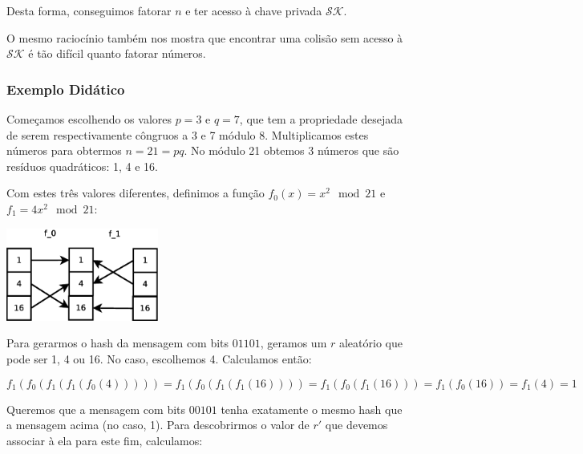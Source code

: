 \documentclass[a4paper]{article}
\begin{document}
Desta forma, conseguimos fatorar $n$ e ter acesso à chave privada
$\mathcal{SK}$.

O mesmo raciocínio também nos mostra que encontrar uma colisão sem
acesso à $\mathcal{SK}$ é tão difícil quanto fatorar números.





  

\subsubsection{Exemplo Didático}

Começamos escolhendo os valores $p=3$ e $q=7$, que tem a propriedade
desejada de serem respectivamente côngruos a 3 e 7 módulo
8. Multiplicamos estes números para obtermos $n = 21 = pq$. No módulo
21 obtemos 3 números que são resíduos quadráticos: 1, 4 e 16.

Com estes três valores diferentes, definimos a função $f_0(x)=x^2\mod
21$ e $f_1=4x^2\mod 21$:

\includegraphics[width=5cm]{imagens/toy1.eps}

Para gerarmos o hash da mensagem com bits $01101$, geramos um $r$
aleatório que pode ser 1, 4 ou 16. No caso, escolhemos 4. Calculamos
então:

$$
f_1(f_0(f_1(f_1(f_0(4))))) = f_1(f_0(f_1(f_1(16)))) = f_1(f_0(f_1(16))) =
f_1(f_0(16)) = f_1(4) = 1
$$

Queremos que a mensagem com bits $00101$ tenha exatamente o mesmo hash
que a mensagem acima (no caso, 1). Para descobrirmos o valor de $r'$
que devemos associar à ela para este fim, calculamos:
\end{document}
